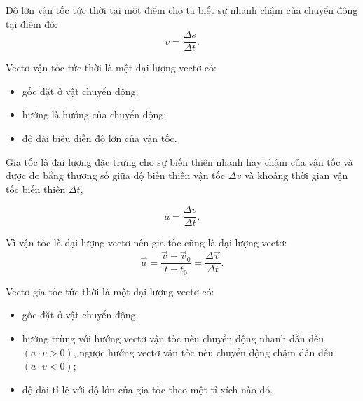\setcounter{section}{0}
	Độ lớn vận tốc tức thời tại một điểm cho ta biết sự nhanh chậm của chuyển động tại điểm đó:
\begin{equation*}
	v=\dfrac{\Delta s}{\Delta t}.
\end{equation*}	

	Vectơ vận tốc tức thời là một đại lượng vectơ có:
\begin{itemize}
	\item gốc đặt ở vật chuyển động;
	\item hướng là hướng của chuyển động;
	\item độ dài biểu diễn độ lớn của vận tốc.
\end{itemize}

	Gia tốc là đại lượng đặc trưng cho sự biến thiên nhanh hay chậm của vận tốc và được đo bằng thương số giữa độ biến thiên vận tốc $\Delta v$ và khoảng thời gian vận tốc biến thiên $\Delta t$,

\begin{equation*}
	a=\dfrac{\Delta v}{\Delta t}.
\end{equation*}	

	Vì vận tốc là đại lượng vectơ nên gia tốc cũng là đại lượng vectơ:
\begin{equation*}
	\vec{a}=\dfrac{\vec{v}-\vec{v}_0}{t-t_0}=\dfrac{\Delta\vec{v}}{\Delta t}.
\end{equation*}

Vectơ gia tốc tức thời là một đại lượng vectơ có:
\begin{itemize}
	\item gốc đặt ở vật chuyển động;
	\item hướng trùng với hướng vectơ vận tốc nếu chuyển động nhanh dần đều $(a\cdot v > 0)$, ngược hướng vectơ vận tốc nếu chuyển động chậm dần đều $(a\cdot v< 0)$;
	\item độ dài tỉ lệ với độ lớn của gia tốc theo một tỉ xích nào đó.
\end{itemize}

